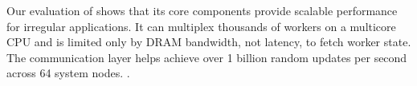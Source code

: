 Our evaluation of \Grappa shows that its core components provide scalable performance for irregular applications.  It can multiplex thousands of workers on a multicore CPU and is limited only by DRAM bandwidth, not latency, to fetch worker state.  The communication layer helps \Grappa achieve over 1 billion random updates per second across 64 system nodes. .

